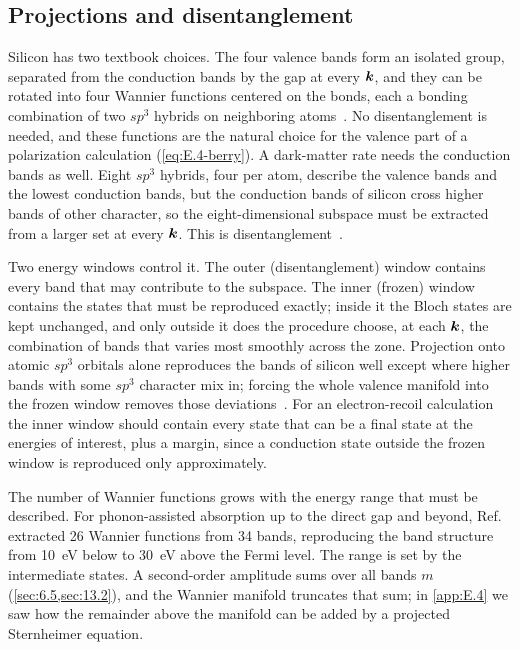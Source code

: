 \subsection{Projections and disentanglement}

Silicon has two textbook choices. The four valence bands form an isolated group, separated from the conduction bands by the gap at every $\bm{k}$, and they can be rotated into four Wannier functions centered on the bonds, each a bonding combination of two $sp^3$ hybrids on neighboring atoms~\cite[Fig.~2]{marzari2012maximally}. No disentanglement is needed, and these functions are the natural choice for the valence part of a polarization calculation (\cref{eq:E.4-berry}). A dark-matter rate needs the conduction bands as well. Eight $sp^3$ hybrids, four per atom, describe the valence bands and the lowest conduction bands, but the conduction bands of silicon cross higher bands of other character, so the eight-dimensional subspace must be extracted from a larger set at every $\bm{k}$. This is disentanglement~\cite{souza2001maximally}.

Two energy windows control it. The outer (disentanglement) window contains every band that may contribute to the subspace. The inner (frozen) window contains the states that must be reproduced exactly; inside it the Bloch states are kept unchanged, and only outside it does the procedure choose, at each $\bm{k}$, the combination of bands that varies most smoothly across the zone. Projection onto atomic $sp^3$ orbitals alone reproduces the bands of silicon well except where higher bands with some $sp^3$ character mix in; forcing the whole valence manifold into the frozen window removes those deviations~\cite[Fig.~5]{marzari2012maximally}. For an electron-recoil calculation the inner window should contain every state that can be a final state at the energies of interest, plus a margin, since a conduction state outside the frozen window is reproduced only approximately.

The number of Wannier functions grows with the energy range that must be described. For phonon-assisted absorption up to the direct gap and beyond, Ref.~\cite{noffsinger2012phonon} extracted 26 Wannier functions from 34 bands, reproducing the band structure from \SI{10}{eV} below to \SI{30}{eV} above the Fermi level. The range is set by the intermediate states. A second-order amplitude sums over all bands $m$ (\cref{sec:6.5,sec:13.2}), and the Wannier manifold truncates that sum; in \cref{app:E.4} we saw how the remainder above the manifold can be added by a projected Sternheimer equation.

